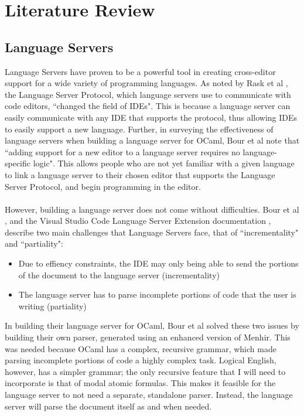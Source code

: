 \documentclass[../main.tex]{subfiles}
\begin{document}
\chapter{Literature Review}
\section{Language Servers}
\label{section:lit-review-servers}
Language Servers have proven to be a powerful tool in creating cross-editor support for a wide variety of programming languages. As noted by Rask et al \cite[]{standardised_lsp_extensions}, the Language Server Protocol, which language servers use to communicate with code editors, ``changed the field of IDEs". This is because a language server can easily communicate with any IDE that supports the protocol, thus allowing IDEs to easily support a new language. Further, in surveying the effectiveness of language servers when building a language server for OCaml, Bour et al \cite[]{merlin_experience_report} note that ``adding support for a new editor to a language server requires no language-specific logic". This allows people who are not yet familiar with a given language to link a language server to their chosen editor that supports the Language Server Protocol, and begin programming in the editor. 
\\ \\
However, building a language server does not come without difficulties. Bour et al \cite[]{merlin_experience_report}, and the Visual Studio Code Language Server Extension documentation \cite[]{vsc_langserver_docs}, describe two main challenges that Language Servers face, that of ``incrementality" and ``partiality":
\begin{itemize}
    \item Due to effiency constraints, the IDE may only being able to send the portions of the document to the language server (incrementality)
    \item The language server has to parse incomplete portions of code that the user is writing (partiality)
\end{itemize}
In building their language server for OCaml, Bour et al solved these two issues by building their own parser, generated using an enhanced version of Menhir. This was needed because OCaml has a complex, recursive grammar, which made parsing incomplete portions of code a highly complex task. Logical English, however, has a simpler grammar; the only recursive feature that I will need to incorporate is that of modal atomic formulas. This makes it feasible for the language server to not need a separate, standalone parser. Instead, the language server will parse the document itself as and when needed.
\end{document}
